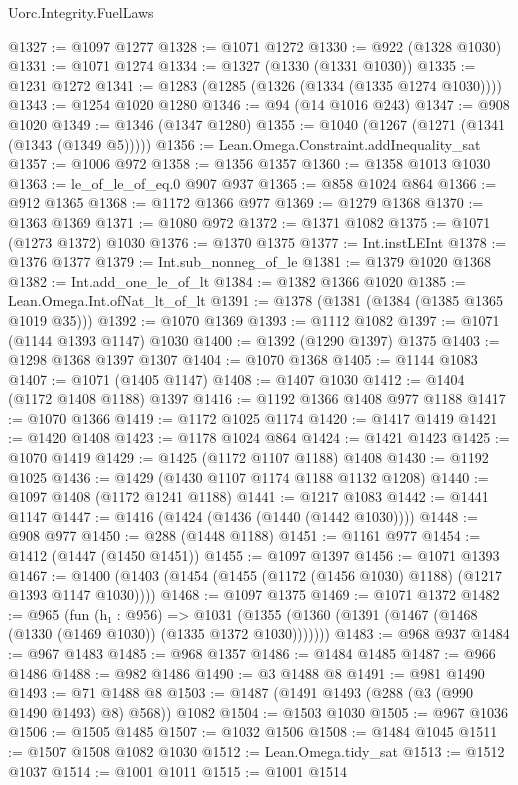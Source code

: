 \begin{lexlean}{Uorc.Integrity.FuelLaws}
\begin{coremodule}
@1327 := @1097 @1277
@1328 := @1071 @1272
@1330 := @922 (@1328 @1030)
@1331 := @1071 @1274
@1334 := @1327 (@1330 (@1331 @1030))
@1335 := @1231 @1272
@1341 := @1283 (@1285 (@1326 (@1334 (@1335 @1274 @1030))))
@1343 := @1254 @1020 @1280
@1346 := @94 (@14 @1016 @243)
@1347 := @908 @1020
@1349 := @1346 (@1347 @1280)
@1355 := @1040 (@1267 (@1271 (@1341 (@1343 (@1349 @5)))))
@1356 := Lean.Omega.Constraint.addInequality_sat
@1357 := @1006 @972
@1358 := @1356 @1357
@1360 := @1358 @1013 @1030
@1363 := le_of_le_of_eq.{0} @907 @937
@1365 := @858 @1024 @864
@1366 := @912 @1365
@1368 := @1172 @1366 @977
@1369 := @1279 @1368
@1370 := @1363 @1369
@1371 := @1080 @972
@1372 := @1371 @1082
@1375 := @1071 (@1273 @1372) @1030
@1376 := @1370 @1375
@1377 := Int.instLEInt
@1378 := @1376 @1377
@1379 := Int.sub_nonneg_of_le
@1381 := @1379 @1020 @1368
@1382 := Int.add_one_le_of_lt
@1384 := @1382 @1366 @1020
@1385 := Lean.Omega.Int.ofNat_lt_of_lt
@1391 := @1378 (@1381 (@1384 (@1385 @1365 @1019 @35)))
@1392 := @1070 @1369
@1393 := @1112 @1082
@1397 := @1071 (@1144 @1393 @1147) @1030
@1400 := @1392 (@1290 @1397) @1375
@1403 := @1298 @1368 @1397 @1307
@1404 := @1070 @1368
@1405 := @1144 @1083
@1407 := @1071 (@1405 @1147)
@1408 := @1407 @1030
@1412 := @1404 (@1172 @1408 @1188) @1397
@1416 := @1192 @1366 @1408 @977 @1188
@1417 := @1070 @1366
@1419 := @1172 @1025 @1174
@1420 := @1417 @1419
@1421 := @1420 @1408
@1423 := @1178 @1024 @864
@1424 := @1421 @1423
@1425 := @1070 @1419
@1429 := @1425 (@1172 @1107 @1188) @1408
@1430 := @1192 @1025
@1436 := @1429 (@1430 @1107 @1174 @1188 @1132 @1208)
@1440 := @1097 @1408 (@1172 @1241 @1188)
@1441 := @1217 @1083
@1442 := @1441 @1147
@1447 := @1416 (@1424 (@1436 (@1440 (@1442 @1030))))
@1448 := @908 @977
@1450 := @288 (@1448 @1188)
@1451 := @1161 @977
@1454 := @1412 (@1447 (@1450 @1451))
@1455 := @1097 @1397
@1456 := @1071 @1393
@1467 := @1400 (@1403 (@1454 (@1455 (@1172 (@1456 @1030) @1188) (@1217 @1393 @1147 @1030))))
@1468 := @1097 @1375
@1469 := @1071 @1372
@1482 := @965
    (fun (h₁ : @956) =>
    @1031 (@1355 (@1360 (@1391 (@1467 (@1468 (@1330 (@1469 @1030)) (@1335 @1372 @1030)))))))
@1483 := @968 @937
@1484 := @967 @1483
@1485 := @968 @1357
@1486 := @1484 @1485
@1487 := @966 @1486
@1488 := @982 @1486
@1490 := @3 @1488 @8
@1491 := @981 @1490
@1493 := @71 @1488 @8
@1503 := @1487 (@1491 @1493 (@288 (@3 (@990 @1490 @1493) @8) @568)) @1082
@1504 := @1503 @1030
@1505 := @967 @1036
@1506 := @1505 @1485
@1507 := @1032 @1506
@1508 := @1484 @1045
@1511 := @1507 @1508 @1082 @1030
@1512 := Lean.Omega.tidy_sat
@1513 := @1512 @1037
@1514 := @1001 @1011
@1515 := @1001 @1514

\end{coremodule}
\end{lexlean}
